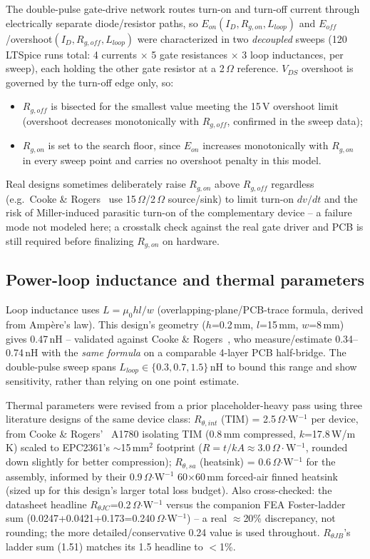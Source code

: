 \documentclass[10pt,twocolumn]{article}
\newcommand{\ohm}{\ensuremath{\Omega}}
\begin{document}
The double-pulse gate-drive network routes turn-on and turn-off current through
electrically separate diode/resistor paths, so $E_{on}(I_D,R_{g,on},L_{loop})$ and
$E_{off}$/overshoot$(I_D,R_{g,off},L_{loop})$ were characterized in two \emph{decoupled}
sweeps (120 LTSpice runs total: 4 currents $\times$ 5 gate resistances $\times$ 3 loop
inductances, per sweep), each holding the other gate resistor at a 2\,\ohm{} reference.
$V_{DS}$ overshoot is governed by the turn-off edge only, so:
\begin{itemize}[leftmargin=1.2em,itemsep=1pt]
\item $R_{g,off}$ is bisected for the smallest value meeting the 15\,V overshoot limit
  (overshoot decreases monotonically with $R_{g,off}$, confirmed in the sweep data);
\item $R_{g,on}$ is set to the search floor, since $E_{on}$ increases monotonically with
  $R_{g,on}$ in every sweep point and carries no overshoot penalty in this model.
\end{itemize}
Real designs sometimes deliberately raise $R_{g,on}$ above $R_{g,off}$ regardless (e.g.\
Cooke \& Rogers~\cite{cooke2025} use 15\,\ohm/2\,\ohm{} source/sink) to limit turn-on
$dv/dt$ and the risk of Miller-induced parasitic turn-on of the complementary device --
a failure mode not modeled here; a crosstalk check against the real gate driver and PCB
is still required before finalizing $R_{g,on}$ on hardware.

\subsection{Power-loop inductance and thermal parameters}
\label{sec:thermal}

Loop inductance uses $L=\mu_0 h l/w$ (overlapping-plane/PCB-trace formula, derived from
Amp\`ere's law). This design's geometry ($h$=0.2\,mm, $l$=15\,mm, $w$=8\,mm) gives
0.47\,nH -- validated against Cooke \& Rogers~\cite{cooke2025}, who measure/estimate
0.34--0.74\,nH with the \emph{same formula} on a comparable 4-layer PCB half-bridge. The
double-pulse sweep spans $L_{loop}\in\{0.3, 0.7, 1.5\}$\,nH to bound this range and show
sensitivity, rather than relying on one point estimate.

Thermal parameters were revised from a prior placeholder-heavy pass using three
literature designs of the same device class: $R_{\theta,int}$ (TIM) = 2.5\,\ohm$\cdot$W$^{-1}$
per device, from Cooke \& Rogers'~\cite{cooke2025} A1780 isolating TIM
(0.8\,mm compressed, $k$=17.8\,W/m\,K) scaled to EPC2361's $\sim$15\,mm$^2$ footprint
($R=t/kA\approx3.0\,\Omega\cdot$W$^{-1}$, rounded down slightly for better compression);
$R_{\theta,sa}$ (heatsink) = 0.6\,\ohm$\cdot$W$^{-1}$ for the assembly, informed by their
0.9\,\ohm$\cdot$W$^{-1}$ 60$\times$60\,mm forced-air finned heatsink (sized up for this
design's larger total loss budget). Also cross-checked: the datasheet headline
$R_{\theta JC}$=0.2\,\ohm$\cdot$W$^{-1}$ versus the companion FEA Foster-ladder sum
(0.0247+0.0421+0.173=0.240\,\ohm$\cdot$W$^{-1}$) -- a real $\approx$20\% discrepancy, not
rounding; the more detailed/conservative 0.24 value is used throughout.
$R_{\theta JB}$'s ladder sum (1.51) matches its 1.5 headline to $<$1\%.
\end{document}
